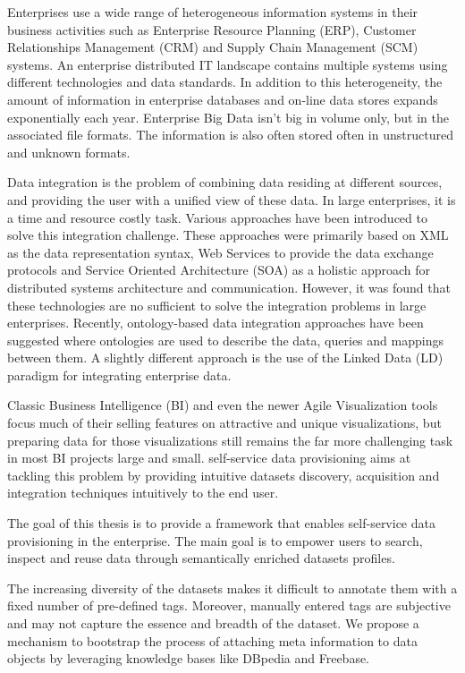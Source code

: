 Enterprises use a wide range of heterogeneous information systems in their business activities such as Enterprise Resource Planning (ERP), Customer Relationships Management (CRM) and Supply Chain Management (SCM) systems. An enterprise distributed IT landscape contains multiple systems using different technologies and data standards. In addition to this heterogeneity, the amount of information in enterprise databases and on-line data stores expands exponentially each year. Enterprise Big Data isn't big in volume only, but in the associated file formats. The information is also often stored often in unstructured and unknown formats.

Data integration is the problem of combining data residing at different sources, and providing the user with a unified view of these data. In large enterprises, it is a time and resource costly task. Various approaches have been introduced to solve this integration challenge. These approaches were primarily based on XML as the data representation syntax, Web Services to provide the data exchange protocols and Service Oriented Architecture (SOA) as a holistic approach for distributed systems architecture and communication. However, it was found that these technologies are no sufficient to solve the integration problems in large enterprises. Recently, ontology-based data integration approaches have been suggested where ontologies are used to describe the data, queries and mappings between them. A slightly different approach is the use of the Linked Data (LD) paradigm for integrating enterprise data.

Classic Business Intelligence (BI) and even the newer Agile Visualization tools focus much of their selling features on attractive and unique visualizations, but preparing data for those visualizations still remains the far more challenging task in most BI projects large and small. self-service data provisioning aims at tackling this problem by providing intuitive datasets discovery, acquisition and integration techniques intuitively to the end user.

The goal of this thesis is to provide a framework that enables self-service data provisioning in the enterprise. The main goal is to empower users to search, inspect and reuse data through semantically enriched datasets profiles.

The increasing diversity of the datasets makes it difficult to annotate them with a fixed number of pre-defined tags. Moreover, manually entered tags are subjective and may not capture the essence and breadth of the dataset. We propose a mechanism to bootstrap the process of attaching meta information to data objects by leveraging knowledge bases like DBpedia and Freebase.

